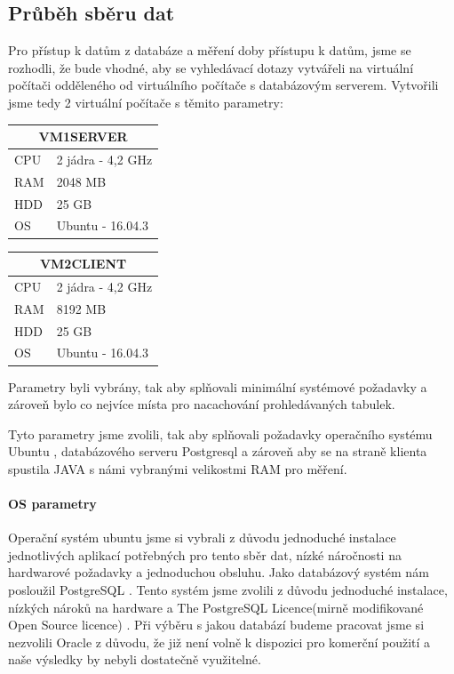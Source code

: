 \documentclass[a4paper, 11pt]{article}
\begin{document}
\subsection{Průběh sběru dat} 
Pro přístup k datům z databáze a měření doby přístupu k datům, jsme se rozhodli, že bude vhodné, aby se vyhledávací dotazy vytvářeli na virtuální počítači odděleného od virtuálního počítače s databázovým serverem. Vytvořili jsme tedy 2 virtuální počítače s těmito parametry: 

\begin{center}
\begin{tabular}{ |l|l| }
  \hline
  \multicolumn{2}{|c|}{VM1SERVER} \\
  \hline
  CPU & 2 jádra - 4,2 GHz \\
  RAM & 2048 MB \\
  HDD & 25 GB\\
  OS & Ubuntu - 16.04.3\\
  \hline
\end{tabular}

\hspace{20 in}

\begin{tabular}{ |l|l| }
  \hline
  \multicolumn{2}{|c|}{VM2CLIENT} \\
  \hline
  CPU & 2 jádra - 4,2 GHz \\
  RAM & 8192 MB \\
  HDD & 25 GB\\
  OS & Ubuntu - 16.04.3\\
  \hline
\end{tabular}
\end{center}
Parametry byli vybrány, tak aby splňovali minimální systémové požadavky a zároveň bylo co nejvíce místa pro nacachování prohledávaných tabulek.


Tyto parametry jsme zvolili, tak aby splňovali požadavky operačního systému Ubuntu \cite{ubuntusysreq}, databázového serveru Postgresql \cite{postgresqlsysreq} a zároveň aby se na straně klienta spustila JAVA s námi vybranými velikostmi RAM pro měření. %
\paragraph{OS parametry} \label{sec:os}
Operační systém ubuntu \cite{ubuntu_web} jsme si vybrali z důvodu jednoduché instalace jednotlivých aplikací potřebných pro tento sběr dat, nízké náročnosti na hardwarové požadavky a jednoduchou obsluhu.
Jako databázový systém nám posloužil PostgreSQL \cite{postgresql_web}. Tento systém jsme zvolili z důvodu jednoduché instalace, nízkých nároků na hardware a The PostgreSQL Licence(mirně modifikované Open Source licence) \cite{postgresqllicence}. Při výběru s jakou databází budeme pracovat jsme si nezvolili Oracle \cite{oracle} z důvodu, že již není volně k dispozici pro komerční použití a naše výsledky by nebyli dostatečně využitelné. 
\end{document}
